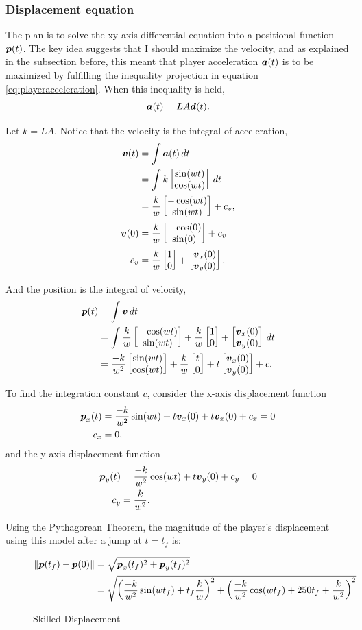 \subsubsection{Displacement equation}
The plan is to solve the xy-axis differential equation into a positional function $\boldsymbol{p}(t)$. The key idea suggests that I should maximize the velocity, and as explained in the subsection before, this meant that player acceleration $\boldsymbol{a}(t)$ is to be maximized by fulfilling the inequality projection in equation \ref{eq:playeracceleration}. When this inequality is held,
\[
    \boldsymbol{a}(t) = LA\boldsymbol{d}(t).
\]

Let $k=LA$. Notice that the velocity is the integral of acceleration,
\begin{align*}
    \boldsymbol{v}(t) &= \int \boldsymbol{a}(t) \, dt\\
    &= \int k \begin{bmatrix}\sin(wt)\\\cos(wt)\end{bmatrix} \, dt\\
    &= \frac{k}{w} \begin{bmatrix}-\cos(wt)\\\sin(wt)\end{bmatrix} + c_v,\\
    \boldsymbol{v}(0) &= \frac{k}{w} \begin{bmatrix}-\cos(0)\\\sin(0)\end{bmatrix} + c_v\\
    c_v &= \frac{k}{w} \begin{bmatrix}1\\0\end{bmatrix} + \begin{bmatrix}\boldsymbol{v}_x(0)\\\boldsymbol{v}_y(0)\end{bmatrix}.
\end{align*}

And the position is the integral of velocity,
\begin{align*}
    \boldsymbol{p}(t) &= \int \boldsymbol{v} \, dt\\
    &= \int \frac{k}{w} \begin{bmatrix}-\cos(wt)\\\sin(wt)\end{bmatrix} + \frac{k}{w}\begin{bmatrix}1\\0\end{bmatrix} + \begin{bmatrix}\boldsymbol{v}_x(0)\\\boldsymbol{v}_y(0)\end{bmatrix} \, dt\\
    &= \frac{-k}{w^2} \begin{bmatrix}\sin(wt)\\\cos(wt)\end{bmatrix} + \frac{k}{w}\begin{bmatrix}t\\0\end{bmatrix}  + t\begin{bmatrix}\boldsymbol{v}_x(0)\\\boldsymbol{v}_y(0)\end{bmatrix} + c.
\end{align*}

To find the integration constant $c$, consider the x-axis displacement function
\begin{align*}
    \boldsymbol{p}_x(t) &= \frac{-k}{w^2} \sin(wt) + t\boldsymbol{v}_x(0) + t\boldsymbol{v}_x(0) + c_x = 0\\
    c_x &= 0,
\end{align*}
and the y-axis displacement function
\begin{align*}
    \boldsymbol{p}_y(t) &= \frac{-k}{w^2} \cos(wt) + t\boldsymbol{v}_y(0) + c_y = 0\\
    c_y &= \frac{k}{w^2}.
\end{align*}

Using the Pythagorean Theorem, the magnitude of the player's displacement using this model after a jump at $t=t_f$ is:
\begin{figure}[H]
    \centering
    \begin{align*}
        \|\boldsymbol{p}(t_f) - \boldsymbol{p}(0)\| &= \sqrt{\boldsymbol{p}_x(t_f)^2 + \boldsymbol{p}_y(t_f)^2}\\
        &= \sqrt{\left(\frac{-k}{w^2}\sin(wt_f) + t_f\frac{k}{w} \right)^2 + \left( \frac{-k}{w^2}\cos(wt_f) + 250t_f + \frac{k}{w^2} \right)^2}
    \end{align*}
    \caption{Skilled Displacement}
    \label{eq:2skilled_displacement}

\end{figure}

